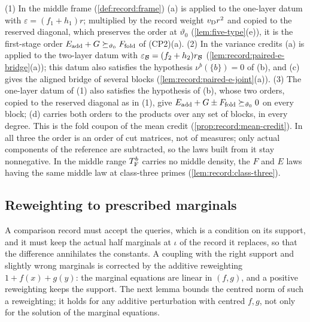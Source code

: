 \begin{remark}\label{rem:polarization-uses}
(1) In the middle frame (\cref{def:record:frame}) (a) is applied to the
one-layer datum with $\varepsilon=(f_1+h_1)r$; multiplied by the record weight
$v_{\rm D}r^2$ and copied to the reserved diagonal, which preserves the order at
$\vartheta_0$ (\cref{lem:five-type}(e)), it is the first-stage order
$E_{\rm add}+G\succeq_{\vartheta_0}F_{\rm fold}$ of (CP2)(a). (2) In the variance
credits (a) is applied to the two-layer datum with
$\varepsilon_{\mathcal B}=(f_2+h_2)r_{\mathcal B}$ (\cref{lem:record:paired-e-bridge}(a)); this
datum also satisfies the hypothesis $\nu^b(\{b\})=0$ of (b), and (c)
gives the aligned bridge of several blocks (\cref{lem:record:paired-e-joint}(a)).
(3) The one-layer datum of (1) also satisfies the hypothesis of (b), whose two
orders, copied to the reserved diagonal as in (1), give
$E_{\rm add}+G\pm F_{\rm fold}\succeq_{\vartheta_0}0$ on every block; (d) carries
both orders to the products over any set of blocks, in every degree. This is
the fold coupon of the mean credit (\cref{prop:record:mean-credit}). In all
three the order is an order of
cut matrices, not of measures; only actual components of the reference are
subtracted, so the laws built from it stay nonnegative. In the middle range
$T_{\rm F}^b$ carries no middle density, the $F$ and $E$ laws having the same
middle law at class-three primes (\cref{lem:record:class-three}).
\end{remark}

\subsection{Reweighting to prescribed marginals}\label{subsec:additive-repair}

A comparison record must accept the queries, which is a condition on its
support, and it must keep the actual half marginals at $\iota$ of the record
it replaces, so that the difference annihilates the constants. A coupling with
the right support and slightly wrong marginals is corrected by the additive
reweighting $1+f(x)+g(y)$: the marginal equations are linear in $(f,g)$, and a
positive reweighting keeps the support. The next lemma bounds the centred norm
of such a reweighting; it holds for any additive perturbation with centred
$f,g$, not only for the solution of the marginal equations.

